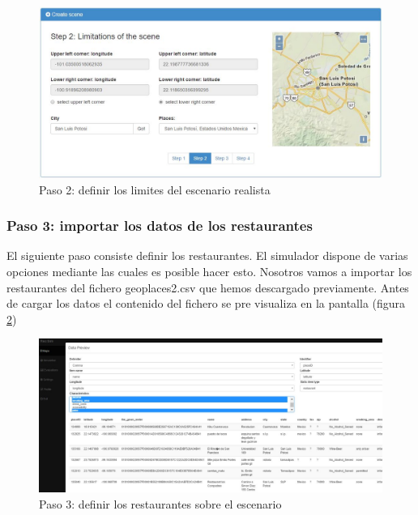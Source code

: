 \begin{figure}[H]
	\centering\includegraphics[scale=0.45]{imagenes/explotacion/2.jpg}
	\caption{Paso 2: definir los limites del escenario realista}
	\label{paso2definirLimitesEscenarioRealista}
\end{figure}

\subsubsection{Paso 3: importar los datos de los restaurantes}

El siguiente paso consiste definir los restaurantes. El simulador dispone de varias opciones mediante las cuales es posible hacer esto. Nosotros vamos a importar los restaurantes del fichero geoplaces2.csv que hemos descargado previamente. Antes de cargar los datos el contenido del fichero se pre visualiza en la pantalla (figura \ref{paso3definirLosRestaurantes})

\begin{figure}[H]
	\centering\includegraphics[scale=0.35]{imagenes/explotacion/3.jpg}
	\caption{Paso 3: definir los restaurantes sobre el escenario}
	\label{paso3definirLosRestaurantes}
\end{figure}

\newpage

